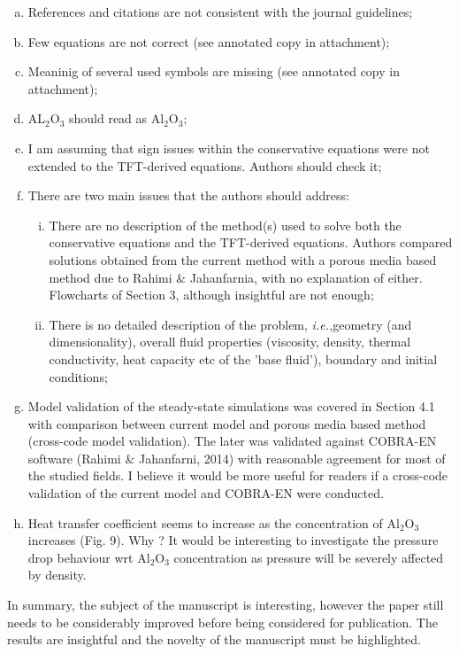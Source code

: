 \documentclass[14pt,twoside]{report}
\newcommand{\ie}{{\it i.e.,}}
\begin{document}
\begin{enumerate}[(a)] 
%
    \item References and citations are not consistent with the journal guidelines;
    \item Few equations are not correct (see annotated copy in attachment);
    \item Meaninig of several used symbols are missing (see annotated copy in attachment);
    \item AL$_{2}$O$_{3}$ should read as Al$_{2}$O$_{3}$;
    \item I am assuming that sign issues within the conservative equations were not extended to the TFT-derived equations. Authors should check it;
    \item There are two main issues that the authors should address:
      \begin{enumerate}[i)]
        \item There are no description of the method(s) used to solve both the conservative equations and the TFT-derived equations. Authors compared solutions obtained from the current method with a porous media based method due to Rahimi $\&$ Jahanfarnia, with no explanation of either. Flowcharts of Section 3, although insightful are not enough;
        \item There is no detailed description of the problem, \ie geometry (and dimensionality), overall fluid properties (viscosity, density, thermal conductivity, heat capacity etc of the 'base fluid'), boundary and initial conditions;
      \end{enumerate}
    \item Model validation of the steady-state simulations was covered in Section 4.1 with comparison between current model and porous media based method (cross-code model validation). The later was validated against COBRA-EN software (Rahimi $\&$ Jahanfarni, 2014) with reasonable agreement for most of the studied fields. I believe it would be more useful for readers if a cross-code validation of the current model and COBRA-EN were conducted.
    \item Heat transfer coefficient seems to increase as the concentration of Al$_{2}$O$_{3}$ increases (Fig. 9). Why ? It would be interesting to investigate the pressure drop behaviour wrt Al$_{2}$O$_{3}$ concentration as pressure will be severely affected by density. 
\end{enumerate}

In summary, the subject of the manuscript is interesting, however the paper still needs to be considerably improved before being considered for publication. The results are insightful and the novelty of the manuscript must be highlighted.
\end{document}
